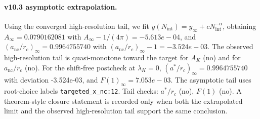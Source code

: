 \paragraph{v10.3 asymptotic extrapolation.}
Using the converged high-resolution tail, we fit $y(N_{\mathrm{int}})=y_{\infty}+cN_{\mathrm{int}}^{-\alpha}$, obtaining $A_\infty=0.0790162081$ with $A_\infty-1/(4\pi)=-5.613e-04$, and $(a_{\mathrm{nc}}/r_c)_\infty=0.9964755740$ with $(a_{\mathrm{nc}}/r_c)_\infty-1=-3.524e-03$. The observed high-resolution tail is quasi-monotone toward the target for $A_K$ (no) and for $a_{\mathrm{nc}}/r_c$ (no). For the shift-free postcheck at $\lambda_K=0$, $(a^*/r_c)_\infty=0.9964755740$ with deviation -3.524e-03, and $F(1)_\infty=7.053e-03$. The asymptotic tail uses root-choice labels \texttt{targeted_x_nc:12}. Tail checks: $a^*/r_c$ (no), $F(1)$ (no). A theorem-style closure statement is recorded only when both the extrapolated limit and the
observed high-resolution tail support the same conclusion.
